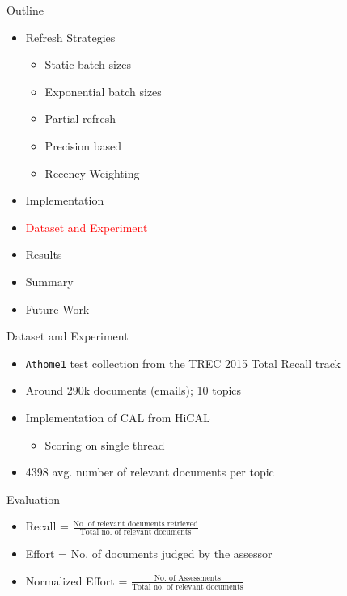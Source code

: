 \documentclass[14pt]{beamer}
\newcommand{\red}[1]{\textcolor{red}{#1}}
\begin{document}
\begin{frame}{Outline}
\begin{itemize}
    \item Refresh Strategies
    \begin{itemize}
        \item Static batch sizes
        \item Exponential batch sizes
        \item Partial refresh
        \item Precision based
        \item Recency Weighting
    \end{itemize}
    \item Implementation
    \item \red{Dataset and Experiment}
    \item Results
    \item Summary
    \item Future Work
\end{itemize}
\end{frame}

\begin{frame}{Dataset and Experiment}
    \begin{itemize}
        \item \texttt{Athome1} test collection from the TREC 2015 Total Recall
            track~\cite{roegiest2015trec}
        \item Around 290k documents (emails); 10 topics
        \item Implementation of CAL from HiCAL
            \begin{itemize}
                \item Scoring on single thread
            \end{itemize}
        \item 4398 avg. number of relevant documents per topic
    \end{itemize}
\end{frame}

\begin{frame}{Evaluation}
    \begin{itemize}
        \item Recall = $\frac{\text{No. of relevant documents retrieved}}{\text{Total no. of
        relevant documents}}$
        \item Effort = No. of documents judged by the assessor
        \item Normalized Effort = $\frac{\text{No. of
                    Assessments}}{\text{Total no. of
            relevant documents}}$
    \end{itemize}
\end{frame}
\end{document}
